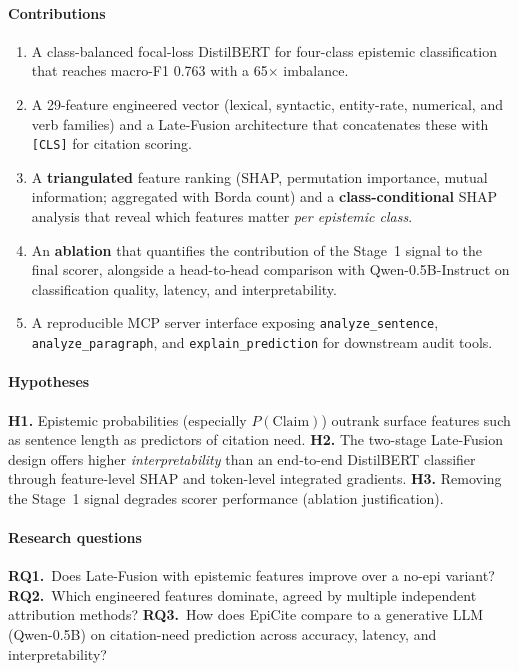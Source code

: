 \documentclass[conference]{IEEEtran}
\begin{document}
\paragraph{Contributions}
\begin{enumerate}[leftmargin=*,nosep]
\item A class-balanced focal-loss DistilBERT for four-class epistemic
classification that reaches macro-F1 0.763 with a 65$\times$ imbalance.
\item A 29-feature engineered vector (lexical, syntactic, entity-rate,
numerical, and verb families) and a Late-Fusion architecture that
concatenates these with \texttt{[CLS]} for citation scoring.
\item A \textbf{triangulated} feature ranking (SHAP, permutation
importance, mutual information; aggregated with Borda count) and a
\textbf{class-conditional} SHAP analysis that reveal which features matter
\emph{per epistemic class}.
\item An \textbf{ablation} that quantifies the contribution of the
Stage~1 signal to the final scorer, alongside a head-to-head comparison
with Qwen-0.5B-Instruct on classification quality, latency, and
interpretability.
\item A reproducible MCP server interface exposing
\texttt{analyze\_sentence}, \texttt{analyze\_paragraph}, and
\texttt{explain\_prediction} for downstream audit tools.
\end{enumerate}

\paragraph{Hypotheses}
\textbf{H1.} Epistemic probabilities (especially $P(\text{Claim})$) outrank
surface features such as sentence length as predictors of citation need.
\textbf{H2.} The two-stage Late-Fusion design offers higher
\emph{interpretability} than an end-to-end DistilBERT classifier through
feature-level SHAP and token-level integrated gradients.
\textbf{H3.} Removing the Stage~1 signal degrades scorer performance
(ablation justification).

\paragraph{Research questions}
\textbf{RQ1.}~Does Late-Fusion with epistemic features improve over a
no-epi variant?
\textbf{RQ2.}~Which engineered features dominate, agreed by multiple
independent attribution methods?
\textbf{RQ3.}~How does EpiCite compare to a generative LLM (Qwen-0.5B) on
citation-need prediction across accuracy, latency, and interpretability?
\end{document}
